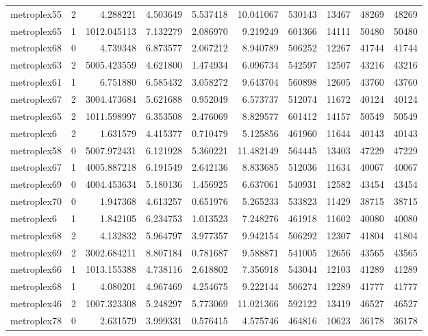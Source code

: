 \begin{longtable}{|l|r|r|r|r|r|r|r|r|r|}
metroplex55 & 2 & 4.288221 & 4.503649 & 5.537418 & 10.041067 & 530143 & 13467 & 48269 & 48269 \\
metroplex65 & 1 & 1012.045113 & 7.132279 & 2.086970 & 9.219249 & 601366 & 14111 & 50480 & 50480 \\
metroplex68 & 0 & 4.739348 & 6.873577 & 2.067212 & 8.940789 & 506252 & 12267 & 41744 & 41744 \\
metroplex63 & 2 & 5005.423559 & 4.621800 & 1.474934 & 6.096734 & 542597 & 12507 & 43216 & 43216 \\
metroplex61 & 1 & 6.751880 & 6.585432 & 3.058272 & 9.643704 & 560898 & 12605 & 43760 & 43760 \\
metroplex67 & 2 & 3004.473684 & 5.621688 & 0.952049 & 6.573737 & 512074 & 11672 & 40124 & 40124 \\
metroplex65 & 2 & 1011.598997 & 6.353508 & 2.476069 & 8.829577 & 601412 & 14157 & 50549 & 50549 \\
metroplex6 & 2 & 1.631579 & 4.415377 & 0.710479 & 5.125856 & 461960 & 11644 & 40143 & 40143 \\
metroplex58 & 0 & 5007.972431 & 6.121928 & 5.360221 & 11.482149 & 564445 & 13403 & 47229 & 47229 \\
metroplex67 & 1 & 4005.887218 & 6.191549 & 2.642136 & 8.833685 & 512036 & 11634 & 40067 & 40067 \\
metroplex69 & 0 & 4004.453634 & 5.180136 & 1.456925 & 6.637061 & 540931 & 12582 & 43454 & 43454 \\
metroplex70 & 0 & 1.947368 & 4.613257 & 0.651976 & 5.265233 & 533823 & 11429 & 38715 & 38715 \\
metroplex6 & 1 & 1.842105 & 6.234753 & 1.013523 & 7.248276 & 461918 & 11602 & 40080 & 40080 \\
metroplex68 & 2 & 4.132832 & 5.964797 & 3.977357 & 9.942154 & 506292 & 12307 & 41804 & 41804 \\
metroplex69 & 2 & 3002.684211 & 8.807184 & 0.781687 & 9.588871 & 541005 & 12656 & 43565 & 43565 \\
metroplex66 & 1 & 1013.155388 & 4.738116 & 2.618802 & 7.356918 & 543044 & 12103 & 41289 & 41289 \\
metroplex68 & 1 & 4.080201 & 4.967469 & 4.254675 & 9.222144 & 506274 & 12289 & 41777 & 41777 \\
metroplex46 & 2 & 1007.323308 & 5.248297 & 5.773069 & 11.021366 & 592122 & 13419 & 46527 & 46527 \\
metroplex78 & 0 & 2.631579 & 3.999331 & 0.576415 & 4.575746 & 464816 & 10623 & 36178 & 36178 \\

\end{longtable}
